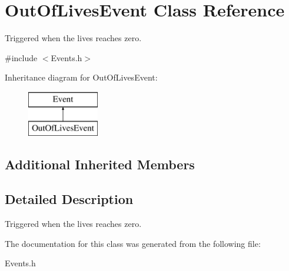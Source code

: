 \hypertarget{classOutOfLivesEvent}{\section{Out\-Of\-Lives\-Event Class Reference}
\label{classOutOfLivesEvent}
}


Triggered when the lives reaches zero.  




{\ttfamily \#include $<$Events.\-h$>$}

Inheritance diagram for Out\-Of\-Lives\-Event\-:\begin{figure}[H]
\begin{center}
\leavevmode
\includegraphics[height=2.000000cm]{classOutOfLivesEvent}
\end{center}
\end{figure}
\subsection*{Additional Inherited Members}


\subsection{Detailed Description}
Triggered when the lives reaches zero. 

The documentation for this class was generated from the following file\-:\begin{DoxyCompactItemize}
\item 
Events.\-h\end{DoxyCompactItemize}
